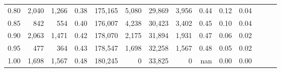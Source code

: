 \begin{tabular}{rrrrrrrrrrrrrr}
0.80 &   2,040 &  1,266 &  0.38 &  175,165 &    5,080 &  29,869 &   3,956 &  0.44 &  0.12 &      0.04 \\
0.85 &     842 &    554 &  0.40 &  176,007 &    4,238 &  30,423 &   3,402 &  0.45 &  0.10 &      0.04 \\
0.90 &   2,063 &  1,471 &  0.42 &  178,070 &    2,175 &  31,894 &   1,931 &  0.47 &  0.06 &      0.02 \\
0.95 &     477 &    364 &  0.43 &  178,547 &    1,698 &  32,258 &   1,567 &  0.48 &  0.05 &      0.02 \\
1.00 &   1,698 &  1,567 &  0.48 &  180,245 &        0 &  33,825 &       0 &   nan &  0.00 &      0.00 \\
\bottomrule
\end{tabular}
